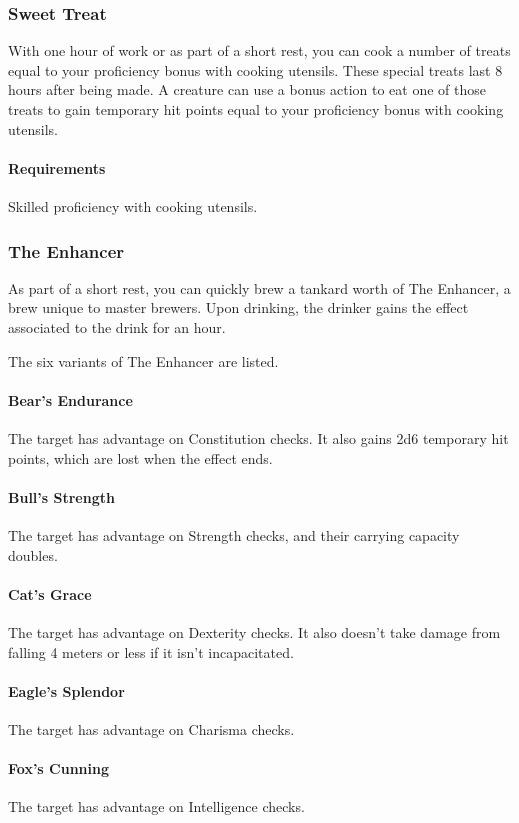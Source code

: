 \subsubsection{Sweet Treat} \label{feat::sweettreat}
    With one hour of work or as part of a short rest, you can cook a number of treats equal to your proficiency bonus with cooking utensils.
    These special treats last 8 hours after being made.
    A creature can use a bonus action to eat one of those treats to gain temporary hit points equal to your proficiency bonus with cooking utensils.
    \paragraph{Requirements} Skilled proficiency with cooking utensils.
\subsubsection{The Enhancer} \label{feat::theenhancer}
    As part of a short rest, you can quickly brew a tankard worth of The Enhancer, a brew unique to master brewers.
    Upon drinking, the drinker gains the effect associated to the drink for an hour.

    The six variants of The Enhancer are listed.
    \paragraph{Bear's Endurance} The target has advantage on Constitution checks.
    It also gains 2d6 temporary hit points, which are lost when the effect ends.
    \paragraph{Bull's Strength} The target has advantage on Strength checks, and their carrying capacity doubles.
    \paragraph{Cat's Grace} The target has advantage on Dexterity checks.
    It also doesn't take damage from falling 4 meters or less if it isn't incapacitated.
    \paragraph{Eagle's Splendor} The target has advantage on Charisma checks.
    \paragraph{Fox's Cunning} The target has advantage on Intelligence checks.

